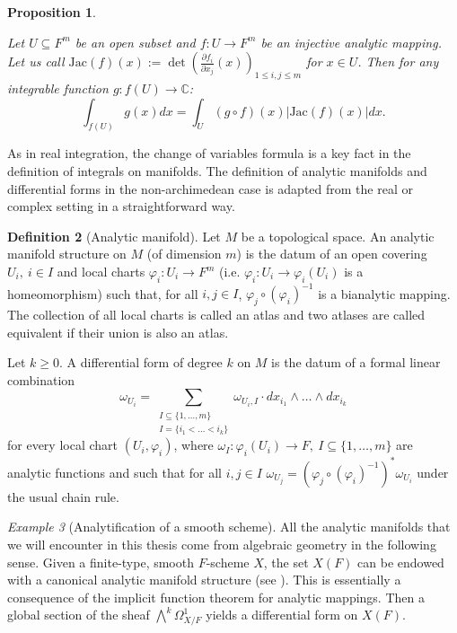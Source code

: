 \documentclass[11pt,english]{article}
\numberwithin{equation}{section}
\numberwithin{figure}{section}
\theoremstyle{definition}
\newtheorem{df}{Definition}[subsection]
\theoremstyle{plain}
\newtheorem{prop}[df]{Proposition}
\theoremstyle{remark}
\newtheorem{exmp}[df]{Example}
\begin{document}
\begin{prop}{\cite[Prop. 7.4.1.]{Igu00}}

Let $U\subseteq F^{m}$ be an open subset and $f:U\rightarrow F^{m}$
be an injective analytic mapping. Let us call $\mathrm{Jac}(f)(x):=\det\left(\frac{\partial f_{i}}{\partial x_{j}}(x)\right)_{1\leq i,j\leq m}$
for $x\in U$. Then for any integrable function $g:f(U)\rightarrow\mathbb{C}$:\[
\int_{f(U)}g(x)dx=\int_{U}(g\circ f)(x)\vert\mathrm{Jac}(f)(x)\vert dx.
\]

\end{prop}

As in real integration, the change of variables formula is a key fact
in the definition of integrals on manifolds. The definition of analytic
manifolds and differential forms in the non-archimedean case is adapted
from the real or complex setting in a straightforward way.

\begin{df}[Analytic manifold]

Let $M$ be a topological space. An analytic manifold structure on
$M$ (of dimension $m$) is the datum of an open covering $U_{i},\ i\in I$
and local charts $\varphi_{i}:U_{i}\rightarrow F^{m}$ (i.e. $\varphi_{i}:U_{i}\rightarrow\varphi_{i}(U_{i})$
is a homeomorphism) such that, for all $i,j\in I$, $\varphi_{j}\circ(\varphi_{i})^{-1}$
is a bianalytic mapping. The collection of all local charts is called
an atlas and two atlases are called equivalent if their union is also
an atlas.

Let $k\geq0$. A differential form of degree $k$ on $M$ is the datum
of a formal linear combination \[
\omega_{U_i}=\sum_{\substack{I\subseteq\{1,\ldots, m\} \\ I=\{i_1<\ldots <i_k\}}}\omega_{U_i,I}\cdot dx_{i_1}\wedge\ldots\wedge dx_{i_{k}}
\] for every local chart $(U_{i},\varphi_{i})$, where $\omega_{I}:\varphi_{i}(U_{i})\rightarrow F,\ I\subseteq\{1,\ldots,m\}$
are analytic functions and such that for all $i,j\in I$ $\omega_{U_{j}}=(\varphi_{j}\circ(\varphi_{i})^{-1})^{*}\omega_{U_{i}}$
under the usual chain rule.

\end{df}

\begin{exmp}[Analytification of a smooth scheme]

All the analytic manifolds that we will encounter in this thesis come
from algebraic geometry in the following sense. Given a finite-type,
smooth $F$-scheme $X$, the set $X(F)$ can be endowed with a canonical
analytic manifold structure (see \cite[Prologue, \S 1.6.3.]{CLNS18}).
This is essentially a consequence of the implicit function theorem
for analytic mappings. Then a global section of the sheaf $\bigwedge^{k}\Omega_{X/F}^{1}$
yields a differential form on $X(F)$.

\end{exmp}
\end{document}
